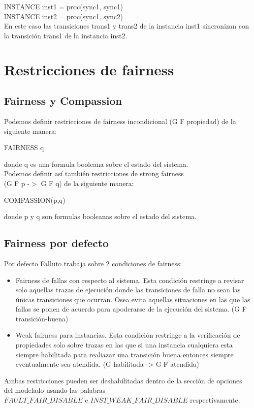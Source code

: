 \documentclass[titlepage, 12pt]{book}
\begin{document}
\noindent INSTANCE inst1 = proc(sync1, sync1)\\
INSTANCE inst2 = proc(sync1, sync2)\\

En este caso las transiciones trans1 y trans2 de la instancia inst1 sincronizan con la transici\'on trans1 de la instancia inst2.\\

\section{Restricciones de fairness}
\subsection{Fairness y Compassion}

Podemos definir restricciones de fairness incondicional (G F propiedad) de la siguiente manera:
\begin{center}FAIRNESS q\end{center}
donde q es una formula booleana sobre el estado del sistema.\\

Podemos definir as\'i tambi\'en restricciones de strong fairness\\ (G F p -$>$ G F q) de la siguiente manera:
\begin{center}COMPASSION(p,q)\end{center}
donde p y q son formulas booleanas sobre el estado del sistema.\\


\subsection{Fairness por defecto}
Por defecto Falluto trabaja sobre 2 condiciones de fairness: 
\begin{itemize}
\item Fairness de fallas con respecto al sistema. Esta condici\'on restringe a revisar solo aquellas trazas de ejecuci\'on donde las transiciones de falla no sean las \'unicas transiciones que ocurran. Osea evita aquellas situaciones en las que las fallas se ponen de acuerdo para apoderarse de la ejecuci\'on del sistema. (G F transici\'on-buena)
\item Weak fairness para instancias. Esta condici\'on restringe a la verificaci\'on de propiedades solo sobre trazas en las que si una instancia cualquiera esta siempre habilitada para realiazar una transici\'on buena entonces siempre eventualmente sea atendida. (G habilitada -> G F atendida)
\end{itemize}
Ambas restricciones pueden ser deshabilitadas dentro de la secci\'on de opciones del modelado usando las palabras\\ $FAULT\_FAIR\_DISABLE$ e $INST\_WEAK\_FAIR\_DISABLE$ respectivamente.
\end{document}
